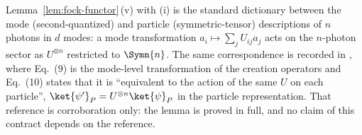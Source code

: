 
\begin{remark}\label{rem:migdal}
Lemma~\ref{lem:fock-functor}\,(v) with (i) is the standard dictionary between the
mode (second-quantized) and particle (symmetric-tensor) descriptions of $n$
photons in $d$ modes: a mode transformation $a_i\mapsto\sum_jU_{ij}a_j$ acts on
the $n$-photon sector as $U^{\otimes n}$ restricted to $\Symn{n}$. The same
correspondence is recorded in \cite[Eqs.~(9)--(10)]{migdal2014multiphoton},
where Eq.~(9) is the mode-level transformation of the creation operators and
Eq.~(10) states that it is ``equivalent to the action of the same $U$ on each
particle'', $\ket{\psi'}_P=U^{\otimes n}\ket{\psi}_P$ in the particle
representation. That reference is corroboration only: the lemma is proved in
full, and no claim of this contract depends on the reference.
\end{remark}
